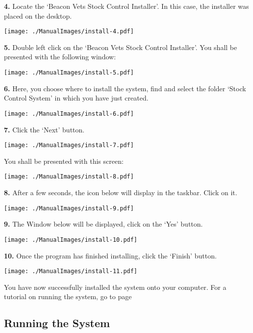 \pagebreak

\textbf{4.} Locate the `Beacon Vets Stock Control Installer'. In this case, the installer was placed on the desktop.

\texttt{[image: ./ManualImages/install-4.pdf]}

\pagebreak

\textbf{5.} Double left click on the `Beacon Vets Stock Control Installer'. You shall be presented with the following window:

\texttt{[image: ./ManualImages/install-5.pdf]}

\pagebreak

\textbf{6.} Here, you choose where to install the system, find and select the folder `Stock Control System' in which you have just created.

\texttt{[image: ./ManualImages/install-6.pdf]}

\pagebreak

\textbf{7.} Click the `Next' button.

\texttt{[image: ./ManualImages/install-7.pdf]}

\pagebreak

You shall be presented with this screen:

\texttt{[image: ./ManualImages/install-8.pdf]}

\pagebreak

\textbf{8.} After a few seconds, the icon below will display in the taskbar. Click on it.

\texttt{[image: ./ManualImages/install-9.pdf]}

\pagebreak

\textbf{9.} The Window below will be displayed, click on the `Yes' button.

\texttt{[image: ./ManualImages/install-10.pdf]}

\pagebreak

\textbf{10.} Once the program has finished installing, click the `Finish' button.

\texttt{[image: ./ManualImages/install-11.pdf]}

You have now successfully installed the system onto your computer. For a tutorial on running the system, go to page \pageref{fig:Running the System}

\pagebreak

\subsection{Running the System}
\label{fig:Running the System}

